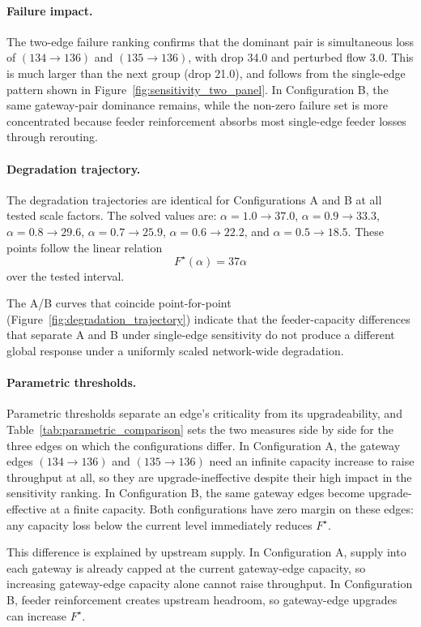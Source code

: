 \documentclass[12pt]{report}
\begin{document}
\paragraph{Failure impact.}
The two-edge failure ranking confirms that the dominant pair is simultaneous loss of $(134\to136)$ and $(135\to136)$, with drop 34.0 and perturbed flow 3.0. This is much larger than the next group (drop 21.0), and follows from the single-edge pattern shown in Figure~\ref{fig:sensitivity_two_panel}. In Configuration B, the same gateway-pair dominance remains, while the non-zero failure set is more concentrated because feeder reinforcement absorbs most single-edge feeder losses through rerouting.

\paragraph{Degradation trajectory.}
The degradation trajectories are identical for Configurations A and B at all tested scale factors. The solved values are: $\alpha=1.0 \rightarrow 37.0$, $\alpha=0.9 \rightarrow 33.3$, $\alpha=0.8 \rightarrow 29.6$, $\alpha=0.7 \rightarrow 25.9$, $\alpha=0.6 \rightarrow 22.2$, and $\alpha=0.5 \rightarrow 18.5$. These points follow the linear relation
\[
F^\star(\alpha)=37\alpha
\]
over the tested interval.

The A/B curves that coincide point-for-point (Figure~\ref{fig:degradation_trajectory}) indicate that the feeder-capacity differences that separate A and B under single-edge sensitivity do not produce a different global response under a uniformly scaled network-wide degradation.

\paragraph{Parametric thresholds.}
Parametric thresholds separate an edge's criticality from its upgradeability, and Table~\ref{tab:parametric_comparison} sets the two measures side by side for the three edges on which the configurations differ. In Configuration A, the gateway edges $(134\to136)$ and $(135\to136)$ need an infinite capacity increase to raise throughput at all, so they are upgrade-ineffective despite their high impact in the sensitivity ranking. In Configuration B, the same gateway edges become upgrade-effective at a finite capacity. Both configurations have zero margin on these edges: any capacity loss below the current level immediately reduces $F^\star$.

This difference is explained by upstream supply. In Configuration A, supply into each gateway is already capped at the current gateway-edge capacity, so increasing gateway-edge capacity alone cannot raise throughput. In Configuration B, feeder reinforcement creates upstream headroom, so gateway-edge upgrades can increase $F^\star$.
\end{document}
